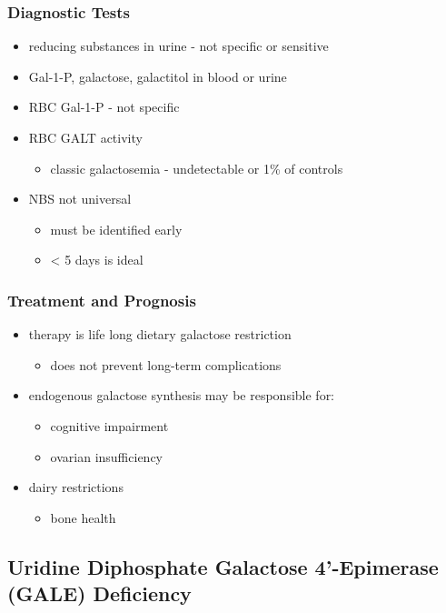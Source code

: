\documentclass{scrartcl}
\begin{document}
\subsubsection{Diagnostic Tests}
\label{sec:orgc4dc418}
\begin{itemize}
\item reducing substances in urine - not specific or sensitive
\item Gal-1-P, galactose, galactitol in blood or urine
\item RBC Gal-1-P - not specific
\item RBC GALT activity
\begin{itemize}
\item classic galactosemia - undetectable or 1\% of controls
\end{itemize}
\item NBS not universal
\begin{itemize}
\item must be identified early
\item \textless{} 5 days is ideal
\end{itemize}
\end{itemize}

\subsubsection{Treatment and Prognosis}
\label{sec:orgc8a8d3a}
\begin{itemize}
\item therapy is life long dietary galactose restriction
\begin{itemize}
\item does not prevent long-term complications
\end{itemize}

\item endogenous galactose synthesis may be responsible for:
\begin{itemize}
\item cognitive impairment
\item ovarian insufficiency
\end{itemize}
\item dairy restrictions
\begin{itemize}
\item bone health
\end{itemize}
\end{itemize}

\subsection{Uridine Diphosphate Galactose 4’-Epimerase (GALE) Deficiency}
\label{sec:org0d833eb}
\end{document}
